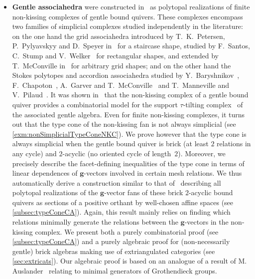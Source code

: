 \documentclass{amsart}
\theoremstyle{definition}
\renewcommand{\b}[1]{{\boldsymbol{#1}}} %
\begin{document}
\smallskip
\begin{itemize}
\item \textbf{Gentle associahedra} were constructed in~\cite{PaluPilaudPlamondon-nonkissing} as polytopal realizations of finite non-kissing complexes of gentle bound quivers.  These complexes encompass two families of simplicial complexes studied independently in the literature: on the one hand the grid associahedra introduced by T.~K.~Petersen, P.~Pylyavskyy and D.~Speyer in~\cite{PetersenPylyavskyySpeyer} for a staircase shape, studied by F.~Santos, C.~Stump and V.~Welker~\cite{SantosStumpWelker} for rectangular shapes, and extended by T.~McConville in~\cite{McConville} for arbitrary grid shapes; and on the other hand the Stokes polytopes and accordion associahedra studied by Y.~Baryshnikov~\cite{Baryshnikov}, F.~Chapoton~\cite{Chapoton-quadrangulations}, A.~Garver and T.~McConville~\cite{GarverMcConville} and T.~Manneville and V.~Pilaud~\cite{MannevillePilaud-accordion}. It was shown in~\cite{PaluPilaudPlamondon-nonkissing, BrustleDouvilleMousavandThomasYildirim} that the non-kissing complex of a gentle bound quiver provides a combinatorial model for the support $\tau$-tilting complex~\cite{AdachiIyamaReiten} of the associated gentle algebra. Even for finite non-kissing complexes, it turns out that the type cone of the non-kissing fan is not always simplicial (see \cref{exm:nonSimplicialTypeConeNKC}). We prove however that the type cone is always simplicial when the gentle bound quiver is brick (at least $2$ relations in any cycle) and $2$-acyclic (no oriented cycle of length~$2$). Moreover, we precisely describe the facet-defining inequalities of the type cone in terms of linear dependences of $\b{g}$-vectors involved in certain mesh relations. We thus automatically derive a construction similar to that of~\cite{ArkaniHamedBaiHeYan, BazierMatteDouvilleMousavandThomasYildirim} describing all polytopal realizations of the $\b{g}$-vector fans of these brick $2$-acyclic bound quivers as sections of a positive orthant by well-chosen affine spaces (see \cref{subsec:typeConeCA}). Again, this result mainly relies on finding which relations minimally generate the relations between the $\b{g}$-vectors in the non-kissing complex. We present both a purely combinatorial proof (see \cref{subsec:typeConeCA}) and a purely algebraic proof for (non-necessarily gentle) brick algebras making use of extriangulated categories (see \cref{sec:extricats}).
Our algebraic proof is based on an analogue of a result of M. Auslander~\cite{Auslander1984} relating to minimal generators of Grothendieck groups.

\end{itemize}
\end{document}
